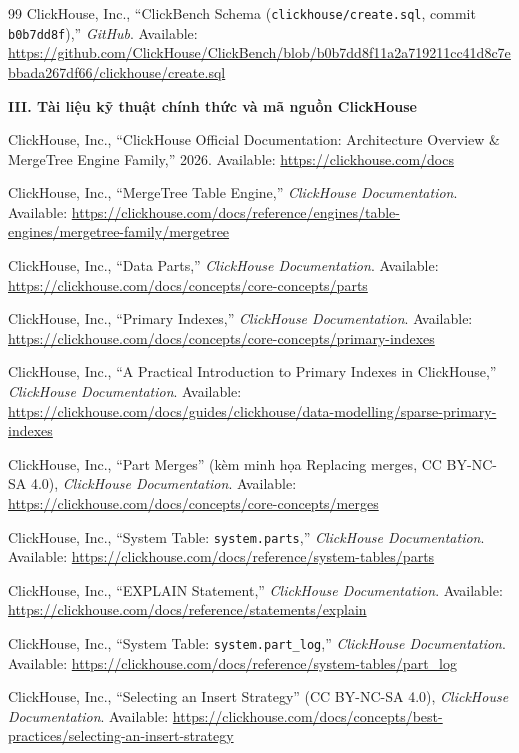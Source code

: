\documentclass[13pt,a4paper]{report}
\begin{document}
\begin{thebibliography}{99}
 ClickHouse, Inc., ``ClickBench Schema (\texttt{clickhouse/create.sql}, commit \texttt{b0b7dd8f}),'' \textit{GitHub}. Available: \url{https://github.com/ClickHouse/ClickBench/blob/b0b7dd8f11a2a719211cc41d8c7ebbada267df66/clickhouse/create.sql}

\item[] \hspace{-\leftmargin}\textbf{III. Tài liệu kỹ thuật chính thức và mã nguồn ClickHouse}

 ClickHouse, Inc., ``ClickHouse Official Documentation: Architecture Overview \& MergeTree Engine Family,'' 2026. Available: \url{https://clickhouse.com/docs}

 ClickHouse, Inc., ``MergeTree Table Engine,'' \textit{ClickHouse Documentation}. Available: \url{https://clickhouse.com/docs/reference/engines/table-engines/mergetree-family/mergetree}

 ClickHouse, Inc., ``Data Parts,'' \textit{ClickHouse Documentation}. Available: \url{https://clickhouse.com/docs/concepts/core-concepts/parts}

 ClickHouse, Inc., ``Primary Indexes,'' \textit{ClickHouse Documentation}. Available: \url{https://clickhouse.com/docs/concepts/core-concepts/primary-indexes}

 ClickHouse, Inc., ``A Practical Introduction to Primary Indexes in ClickHouse,'' \textit{ClickHouse Documentation}. Available: \url{https://clickhouse.com/docs/guides/clickhouse/data-modelling/sparse-primary-indexes}

 ClickHouse, Inc., ``Part Merges'' (kèm minh họa Replacing merges, CC BY-NC-SA 4.0), \textit{ClickHouse Documentation}. Available: \url{https://clickhouse.com/docs/concepts/core-concepts/merges}

 ClickHouse, Inc., ``System Table: \texttt{system.parts},'' \textit{ClickHouse Documentation}. Available: \url{https://clickhouse.com/docs/reference/system-tables/parts}

 ClickHouse, Inc., ``EXPLAIN Statement,'' \textit{ClickHouse Documentation}. Available: \url{https://clickhouse.com/docs/reference/statements/explain}

 ClickHouse, Inc., ``System Table: \texttt{system.part\_log},'' \textit{ClickHouse Documentation}. Available: \url{https://clickhouse.com/docs/reference/system-tables/part_log}

 ClickHouse, Inc., ``Selecting an Insert Strategy'' (CC BY-NC-SA 4.0), \textit{ClickHouse Documentation}. Available: \url{https://clickhouse.com/docs/concepts/best-practices/selecting-an-insert-strategy}


\end{thebibliography}
\end{document}

